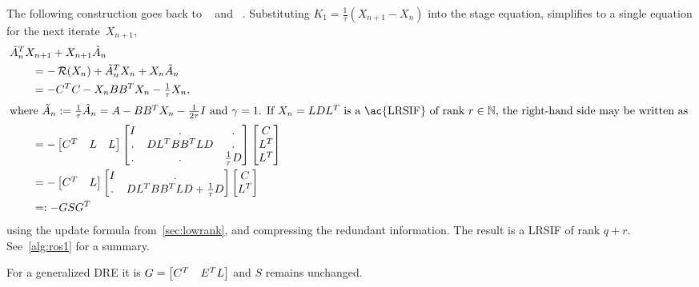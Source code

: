 The following construction goes back to \citeauthor{Mena2007}~\cite[Section~4.3.3]{Mena2007} and \citeauthor{Lang2017}~\cite[Section~6.2.2]{Lang2017}.
Substituting $K_1 = \frac{1}{\tau}(X_{n+1} - X_n)$ into the stage equation,
 simplifies to a single \Lyapunov equation for the next iterate~$X_{n+1}$,
\begin{subequations}
\label{eq:ros:LR:ros1}
\begin{align}
  \MoveEqLeft
  \tilde A_n^\T X_{n+1} + X_{n+1} \tilde A_n
  \nonumber \\
  &= -\Ricc(X_n) +
  \tilde A_n^\T X_n + X_n \tilde A_n \\
  &= -C^\T C - X_n BB^\T X_n - \tfrac{1}{\tau} X_n ,\\
\intertext{%
where $\tilde A_n := \frac{1}{\tau} \hat A_n = A - BB^\T X_n - \frac{1}{2\tau} I$ and $\gamma=1$.
If $X_n = LDL^\T$ is a \ac{LRSIF} of rank $r\in\N$,
the right-hand side may be written as
}
  &= -\begin{bmatrix}
    C^\T & L & L
  \end{bmatrix}
  \begin{bmatrix}
    I & . & . \\
    . & DL^\T BB^\T LD & . \\
    . & . & \tfrac{1}{\tau} D
  \end{bmatrix}
  \begin{bmatrix}
    C \\ L^\T \\ L^\T
  \end{bmatrix} \\
  \label{eq:ros:lr-condensed:1}
  &= -\begin{bmatrix}
    C^\T & L
  \end{bmatrix}
  \begin{bmatrix}
    I & . \\
    . & DL^\T BB^\T LD + \tfrac{1}{\tau} D
  \end{bmatrix}
  \begin{bmatrix}
    C \\ L^\T
  \end{bmatrix} \\
  &=: -GSG^\T
\end{align}
\end{subequations}
using the update formula from~\autoref{sec:lowrank},
and compressing the redundant information.
The result is a \ac{LRSIF} of rank $q + r$.
See~\autoref{alg:ros1} for a summary.

\begin{remark}
  For a generalized \ac{DRE} it is $G = \begin{bmatrix}
    C^T & E^T L
  \end{bmatrix}$ and $S$ remains unchanged.
\end{remark}

